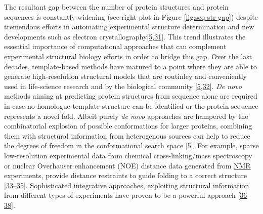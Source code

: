 \documentclass[11pt,a4paper,twoside]{book}
\theoremstyle{definition}
\theoremstyle{definition}
\theoremstyle{remark}
\begin{document}
The resultant gap between the number of protein structures and protein
sequences is constantly widening (see right plot in Figure
\ref{fig:seq-str-gap}) despite tremendous efforts in automating
experimental structure determination and new developments such as
electron
crystallography{[}\protect\hyperlink{ref-Schwede2013}{5},\protect\hyperlink{ref-Clabbers2017}{31}{]}.
This trend illustrates the essential importance of computational
approaches that can complement experimental structural biology efforts
in order to bridge this gap. Over the last decades, template-based
methods have matured to a point where they are able to generate
high-resolution structural models that are routinley and conveniently
used in life-science research and by the biological community
{[}\protect\hyperlink{ref-Schwede2013}{5},\protect\hyperlink{ref-BKC2016}{32}{]}.
\emph{De novo} methods aiming at predicting protein structures from
sequence alone are required in case no homologue template structure can
be identified or the protein sequence represents a novel fold. Albeit
purely \emph{de novo} approaches are hampered by the combinatorial
explosion of possible conformations for larger proteins, combining them
with structural information from heterogenous sources can help to reduce
the degrees of freedom in the conformational search space
{[}\protect\hyperlink{ref-Schwede2013}{5}{]}. For example, sparse
low-resolution experimental data from chemical cross-linking/mass
spectroscopy or nuclear Overhauser enhancement (NOE) distance data
generated from \protect\hyperlink{abbrev}{NMR} experiments, provide
distance restraints to guide folding to a correct structure
{[}\protect\hyperlink{ref-Li2004}{33}--\protect\hyperlink{ref-Rappsilber2011}{35}{]}.
Sophisticated integrative approaches, exploiting structural information
from different types of experiments have proven to be a powerful
approach
{[}\protect\hyperlink{ref-Ornes2016}{36}--\protect\hyperlink{ref-Tang2015}{38}{]}.
\end{document}
